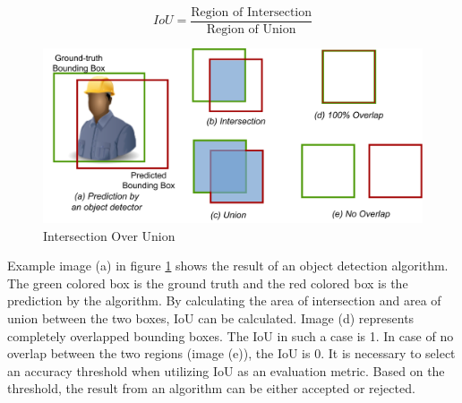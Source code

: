 \begin{equation}\label{eq:iou}
    IoU = \frac{\text{Region of Intersection}}{\text{Region of Union}}
\end{equation}

\begin{figure}[htb]
    \centering
    \includegraphics[width=1\linewidth]{97_graphics//related_work/iou.pdf}
    \caption{Intersection Over Union}
    \label{fig:related_work-iou}
\end{figure}

Example image (a) in figure \ref{fig:related_work-iou} shows the result of an object detection algorithm. The green colored box is the ground truth and the red colored box is the prediction by the algorithm. By calculating the area of intersection and area of union between the two boxes, IoU can be calculated. Image (d) represents completely overlapped bounding boxes. The IoU in such a case is 1. In case of no overlap between the two regions  (image (e)), the IoU is 0. It is necessary to select an accuracy threshold when utilizing IoU as an evaluation metric. Based on the threshold, the result from an algorithm can be either accepted or rejected.
